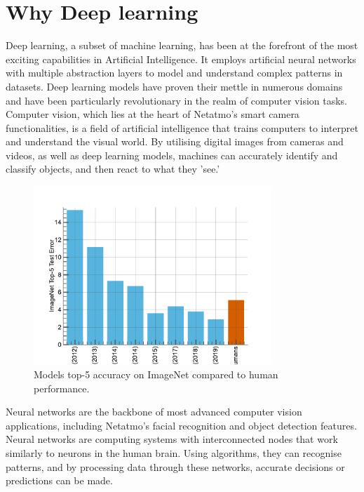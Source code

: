 \section{Why Deep learning}

Deep learning, a subset of machine learning, has been at the forefront of the
most exciting capabilities in Artificial Intelligence. It employs artificial
neural networks with multiple abstraction layers to model and understand complex
patterns in datasets. Deep learning models have proven their mettle in numerous
domains and have been particularly revolutionary in the realm of computer vision
tasks.\\

Computer vision, which lies at the heart of Netatmo's smart camera
functionalities, is a field of artificial intelligence that trains computers to
interpret and understand the visual world. By utilising digital images from
cameras and videos, as well as deep learning models, machines can accurately
identify and classify objects, and then react to what they 'see.'\\

\begin{figure}[htbp]
    \centering
    \includegraphics[width=0.8\textwidth]{chapter_intro/assets/models_vs_human.pdf}
    \caption{Models top-5 accuracy on ImageNet \cite{deng2009imagenet} compared
    to human performance.}
    \label{fig:intro:models_vs_humans}
\end{figure}

Neural networks are the backbone of most advanced computer vision applications,
including Netatmo's facial recognition and object detection features. Neural
networks are computing systems with interconnected nodes that work similarly to
neurons in the human brain. Using algorithms, they can recognise patterns, and
by processing data through these networks, accurate decisions or predictions can
be made.\\

